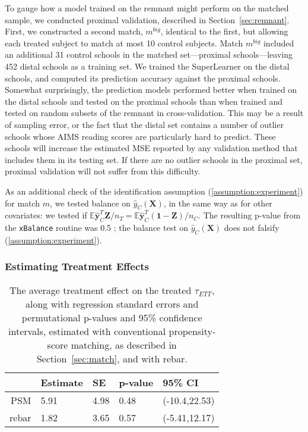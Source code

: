 \documentclass[12pt]{article}\usepackage[]{graphicx}\usepackage[]{color}
\newcommand{\EE}{\mathbb{E}}
\newcommand{\match}{m}
\newcommand{\covMat}{\bm{X}}
\begin{document}
To gauge how a model trained on the remnant might perform on the matched sample, we conducted proximal validation, described in Section~\ref{sec:remnant}.
First, we constructed a second match, $\match^{big}$, identical to the first, but allowing each treated subject to match at most 10 control subjects.
Match $\match^{big}$ included an additional
31 control schools in the
matched set---proximal schools---leaving 452 distal schools as a training set.
We trained the SuperLearner on the distal schools, and computed its
prediction accuracy against the proximal schools.
Somewhat surprisingly, the prediction models performed better when
trained on the distal schools and tested on the proximal schools than
when trained and tested on random subsets of the remnant in cross-validation.
This may be a result of sampling error, or the fact that the distal set contains a number of outlier schools whose AIMS reading scores are particularly hard to predict.
These schools will increase the estimated MSE reported by any validation method that includes them in its testing set.
If there are no outlier schools in the proximal set, proximal validation will not suffer from this difficulty.

As an additional check of the identification assumption (\ref{assumption:experiment}) for match $\match$, we tested balance on $\hat{y}_C(\covMat)$, in the same way as for other covariates: we tested if $\EE \bm{\hat{y}}_C^T\bm{Z}/n_T=\EE \bm{\hat{y}}_C^T(\bm{1}-\bm{Z})/n_C$.
The resulting p-value from the \verb|xBalance| routine was
0.5%
; the balance test on $\hat{y}_C(\covMat)$ does not falsify (\ref{assumption:experiment}).

\subsubsection{Estimating Treatment Effects}




\begin{table}[ht]
\centering
\begin{tabular}{rllll}
  \hline
 & Estimate & SE & p-value & 95\% CI \\ 
  \hline
PSM & 5.91 & 4.98 & 0.48 & (-10.4,22.53) \\ 
  rebar & 1.82 & 3.65 & 0.57 & (-5.41,12.17) \\ 
   \hline
\end{tabular}
\caption{The average treatment effect on the treated $\tau_{ETT}$, along with regression standard errors and permutational p-values and 95\%
confidence intervals, estimated with conventional propensity-score matching, as described in Section~\ref{sec:match}, and with rebar.} 
\label{table:results}
\end{table}
\end{document}
